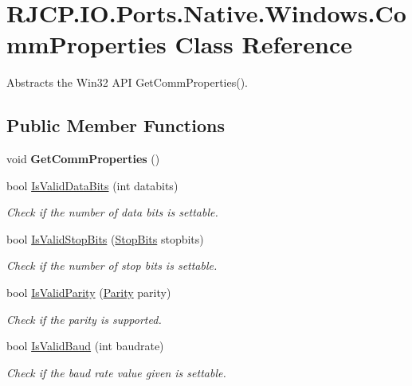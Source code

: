 \hypertarget{class_r_j_c_p_1_1_i_o_1_1_ports_1_1_native_1_1_windows_1_1_comm_properties}{}\section{R\+J\+C\+P.\+I\+O.\+Ports.\+Native.\+Windows.\+Comm\+Properties Class Reference}
\label{class_r_j_c_p_1_1_i_o_1_1_ports_1_1_native_1_1_windows_1_1_comm_properties}


Abstracts the Win32 A\+PI Get\+Comm\+Properties().  


\subsection*{Public Member Functions}
\begin{DoxyCompactItemize}
\item 
\mbox{\label{class_r_j_c_p_1_1_i_o_1_1_ports_1_1_native_1_1_windows_1_1_comm_properties_a7f342cef3a0920abf213c1f60843d14c}} 
void {\bfseries Get\+Comm\+Properties} ()
\item 
bool \mbox{\hyperlink{class_r_j_c_p_1_1_i_o_1_1_ports_1_1_native_1_1_windows_1_1_comm_properties_a25fa4b8cd5c49959427e1f04a236b518}{Is\+Valid\+Data\+Bits}} (int databits)
\begin{DoxyCompactList}\small\item\em Check if the number of data bits is settable. \end{DoxyCompactList}\item 
bool \mbox{\hyperlink{class_r_j_c_p_1_1_i_o_1_1_ports_1_1_native_1_1_windows_1_1_comm_properties_a0afc93c2b4e0bf52a173a24e7bd2906e}{Is\+Valid\+Stop\+Bits}} (\mbox{\hyperlink{namespace_r_j_c_p_1_1_i_o_1_1_ports_a56a13b591d46736acafe20f2976c84fa}{Stop\+Bits}} stopbits)
\begin{DoxyCompactList}\small\item\em Check if the number of stop bits is settable. \end{DoxyCompactList}\item 
bool \mbox{\hyperlink{class_r_j_c_p_1_1_i_o_1_1_ports_1_1_native_1_1_windows_1_1_comm_properties_a5eaedb3f4a21a4f8ff2b33ed00c65e8a}{Is\+Valid\+Parity}} (\mbox{\hyperlink{namespace_r_j_c_p_1_1_i_o_1_1_ports_a35c8c760a80dd0392e605dd3ad169954}{Parity}} parity)
\begin{DoxyCompactList}\small\item\em Check if the parity is supported. \end{DoxyCompactList}\item 
bool \mbox{\hyperlink{class_r_j_c_p_1_1_i_o_1_1_ports_1_1_native_1_1_windows_1_1_comm_properties_af6c03c2be7494e8cacdadc37da64054a}{Is\+Valid\+Baud}} (int baudrate)
\begin{DoxyCompactList}\small\item\em Check if the baud rate value given is settable. \end{DoxyCompactList}\end{DoxyCompactItemize}
